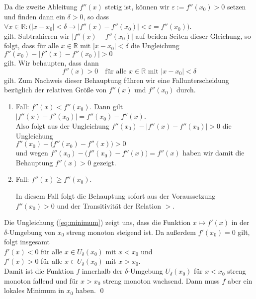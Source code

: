 \proof Da die zweite Ableitung $f''(x)$ stetig ist, k\"onnen wir $\varepsilon := f''(x_0) > 0$
setzen und finden dann ein $\delta > 0$, so dass
\\[0.2cm]
\hspace*{1.3cm}
 $\forall x \in \mathbb{R}:\bigl(
    |x - x_0| < \delta \rightarrow |f''(x) - f''(x_0)| < \varepsilon = f''(x_0)\bigr)
$.
\\[0.2cm]
gilt.  Subtrahieren wir $|f''(x) - f''(x_0)|$ auf beiden Seiten dieser Gleichung, so folgt, dass f\"ur
alle $x \in \mathbb{R}$ mit $|x - x_0| < \delta$ die Ungleichung
\\[0.2cm]
\hspace*{1.3cm} $f''(x_0) - |f''(x) - f''(x_0)| > 0$
\\[0.2cm]
gilt.  Wir behaupten, dass dann
\begin{equation}
  \label{eq:minimum}
 f''(x) > 0 \quad \mbox{f\"ur alle $x \in \mathbb{R}$ mit $|x - x_0| < \delta$} 
\end{equation}
gilt.
Zum Nachweis dieser Behauptung f\"uhren wir eine Fallunterscheidung bez\"uglich der relativen
Gr\"o{\ss}e von $f''(x)$ und $f''(x_0)$ durch.
\begin{enumerate}
\item Fall: $f''(x) < f''(x_0)$.  Dann gilt 
      \\[0.2cm]
      \hspace*{1.3cm}
      $|f''(x) - f''(x_0)| = f''(x_0) - f''(x)$.
      \\[0.2cm]
      Also folgt aus der Ungleichung $f''(x_0) - |f''(x) - f''(x_0)| > 0$ die Ungleichung
      \\[0.2cm]
      \hspace*{1.3cm}
      $f''(x_0) - \bigl(f''(x_0) - f''(x)\bigr) > 0$
      \\[0.2cm]
      und wegen $f''(x_0) - \bigl(f''(x_0) - f''(x)\bigr) = f''(x)$ haben wir damit die Behauptung
      $f''(x) > 0$ gezeigt.
\item Fall: $f''(x) \geq f''(x_0)$.  

      In diesem Fall folgt die Behauptung sofort aus der Voraussetzung
      $f''(x_0) > 0$ und der Transitivit\"at der Relation $>$.
\end{enumerate}
Die Ungleichung (\ref{eq:minimum}) zeigt uns, dass die Funktion $x \mapsto f'(x)$ in der $\delta$-Umgebung
von $x_0$ streng monoton steigend ist.  Da au{\ss}erdem $f'(x_0) = 0$ gilt, folgt insgesamt
\\[0.2cm]
\hspace*{1.3cm}
$f'(x) < 0$ \quad f\"ur alle $x\in U_\delta(x_0)$ mit $x < x_0$ \quad und \quad \\[0.2cm]
\hspace*{1.3cm}
$f'(x) > 0$ \quad f\"ur alle $x\in U_\delta(x_0)$ mit $x > x_0$.
\\[0.2cm]
Damit ist die Funktion $f$ innerhalb der $\delta$-Umgebung $U_\delta(x_0)$ f\"ur $x < x_0$
streng monoton fallend und f\"ur $x > x_0$ streng monoton wachsend.  Dann muss $f$ aber ein lokales Minimum in
$x_0$ haben. \qed


